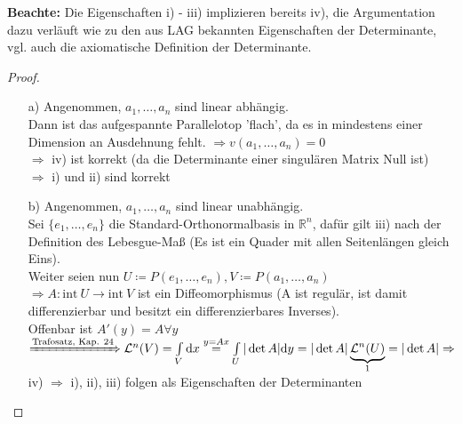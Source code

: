     \textbf{Beachte:} Die Eigenschaften i) - iii) implizieren bereits iv), die Argumentation
    dazu verläuft wie zu den aus LAG bekannten Eigenschaften der Determinante, vgl.
    auch die axiomatische Definition der Determinante.

\begin{proof}
    \mbox{}
    \begin{enumerate}
        \item[a)] 
            Angenommen, $a_1, \ldots, a_n$ sind linear abhängig. \\
            Dann ist das aufgespannte Parallelotop 'flach', da es in mindestens 
            einer Dimension an Ausdehnung fehlt.
            $\Rightarrow v(a_1, \ldots, a_n) = 0 $ \\
            $\Rightarrow $ iv) ist korrekt 
            (da die Determinante einer singulären Matrix Null ist) \\
            $\Rightarrow $ i) und ii) sind korrekt
        \item[b)]
            Angenommen, $a_1, \ldots, a_n$ sind linear unabhängig. \\
            Sei $\lbrace e_1, \ldots, e_n \rbrace$ die Standard-Orthonormalbasis in
            $\mathbb{R}^n $, dafür gilt iii) nach der Definition des Lebesgue-Maß
            (Es ist ein Quader mit allen Seitenlängen gleich Eins). \\
            Weiter seien nun $U \coloneqq P(e_1, \ldots, e_n),
            V \coloneqq P(a_1, \ldots, a_n) $ \\
            $\Rightarrow A: \mathrm{int}\ U \rightarrow \mathrm{int}\ V $
            ist ein Diffeomorphismus (A ist regulär, ist damit differenzierbar und
            besitzt ein differenzierbares Inverses). \\
            Offenbar ist $A'(y) = A \forall y $ \\
            $\xRightarrow{\text{Trafosatz, Kap. 24}}
            \mathcal{L}^n (V) = \int\limits_V \mathrm{d}x \stackrel{y = Ax}{=}
            \int\limits_U |\det A| \mathrm{d}y = |\det A| \underbrace{\mathcal{L}^n (U)}_1
            = |\det A|
            \Rightarrow $ iv) $\Rightarrow $ i), ii), iii) folgen als Eigenschaften
            der Determinanten
    \end{enumerate}
\end{proof}

